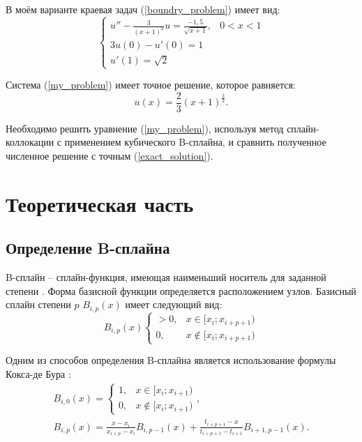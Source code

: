 \documentclass[a4paper,14pt]{extarticle}
\begin{document}
    В моём варианте краевая задач (\ref{boundry_problem}) имеет вид:
    \begin{equation} \label{my_problem}
        \begin{cases} \displaystyle
        u'' - \frac{3}{(x + 1)^2} u = \frac{-1,5}{\sqrt{x + 1}}, & 0 < x < 1 \\
        3u(0) - u'(0) = 1\\
        u'(1) = \sqrt{2}
    \end{cases}
    \end{equation}

    Система (\ref{my_problem}) имеет точное решение, которое равняется:
    \begin{equation} \label{exact_solution}
        \displaystyle u(x) = \frac{2}{3} (x + 1)^{\frac{3}{2}}.
    \end{equation}

    Необходимо решить уравнение (\ref{my_problem}), используя метод сплайн-коллокации с применением кубического B-сплайна, и сравнить полученное численное решение с точным (\ref{exact_solution}).

    \newpage
    \section{Теоретическая часть}
    \subsection{Определение B-сплайна}

    B-сплайн -- сплайн-функция, имеющая наименьший носитель для заданной степени \cite{B-spline}.
    Форма базисной функции определяется расположением узлов.
    Базисный сплайн степени $p$ $B_{i, p}(x)$ имеет следующий вид:
    \begin{equation*}
        B_{i, p}(x) \begin{cases}
            > 0, & x \in [x_{i}; x_{i + p + 1}) \\
            0, & x \notin [x_{i}; x_{i + p + 1})
        \end{cases}
    \end{equation*}

    Одним из способов определения B-сплайна является использование формулы Кокса-де Бура \cite{Cox-de_Boer}: \\
    \begin{equation} \label{Cox-de_Boer}
        \begin{gathered}
            B_{i, 0}(x) = \begin{cases}
                1, & x \in [x_i; x_{i + 1}) \\
                0, & x \notin [x_i; x_{i + 1})
            \end{cases}, \\
            \displaystyle B_{i, p}(x) = \frac{x - x_i}{x_{i + p} - x_i} B_{i, p - 1}(x) + \frac{t_{i + p + 1} - x}{t_{i + p + 1} - t_{i + 1}} B_{i + 1, p - 1} (x).
        \end{gathered}
    \end{equation}
\end{document}
